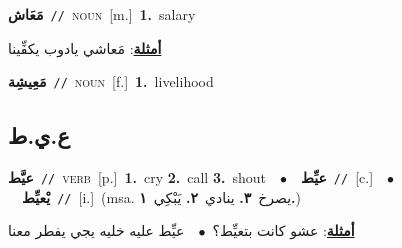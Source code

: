 \documentclass[10pt,a4paper,twoside]{article} %
\begin{document}
\begin{multicols}{2}
{\setlength\topsep{0pt}\textbf{\foreignlanguage{arabic}{مَعَاش}}\ {\color{gray}\texttt{//}\color{black}}\ \textsc{noun}\ [m.]\ \textbf{1.}~salary\  \begin{flushright}\color{gray}\foreignlanguage{arabic}{\textbf{\underline{\foreignlanguage{arabic}{أمثلة}}}: مَعاشي يادوب يكفِّينا}\end{flushright}\color{black}} \vspace{2mm}

{\setlength\topsep{0pt}\textbf{\foreignlanguage{arabic}{مَعِيشِة}}\ {\color{gray}\texttt{//}\color{black}}\ \textsc{noun}\ [f.]\ \textbf{1.}~livelihood\ } \vspace{2mm}

\vspace{-3mm}
\subsection*{\color{blue}\foreignlanguage{arabic}{ع.ي.ط}\color{blue}{}} 

{\setlength\topsep{0pt}\textbf{\foreignlanguage{arabic}{عيَّط}}\ {\color{gray}\texttt{//}\color{black}}\ \textsc{verb}\ [p.]\ \textbf{1.}~cry  \textbf{2.}~call  \textbf{3.}~shout\ \ $\bullet$\ \ \setlength\topsep{0pt}\textbf{\foreignlanguage{arabic}{عيِّط}}\ {\color{gray}\texttt{//}\color{black}}\ [c.]\ \ $\bullet$\ \ \setlength\topsep{0pt}\textbf{\foreignlanguage{arabic}{يْعيِّط}}\ {\color{gray}\texttt{//}\color{black}}\ [i.]\ \color{gray}(msa. \foreignlanguage{arabic}{يصرخ}~\foreignlanguage{arabic}{\textbf{٣.}}  \foreignlanguage{arabic}{ينادي}~\foreignlanguage{arabic}{\textbf{٢.}}  \foreignlanguage{arabic}{يَبْكِي}~\foreignlanguage{arabic}{\textbf{١.}})\color{black}\  \begin{flushright}\color{gray}\foreignlanguage{arabic}{\textbf{\underline{\foreignlanguage{arabic}{أمثلة}}}: عشو كانت بتعيِّط؟\ $\bullet$\ \  عيِّط عليه خليه يجي يفطر معنا}\end{flushright}\color{black}} \vspace{2mm}


\end{multicols}
\end{document}

